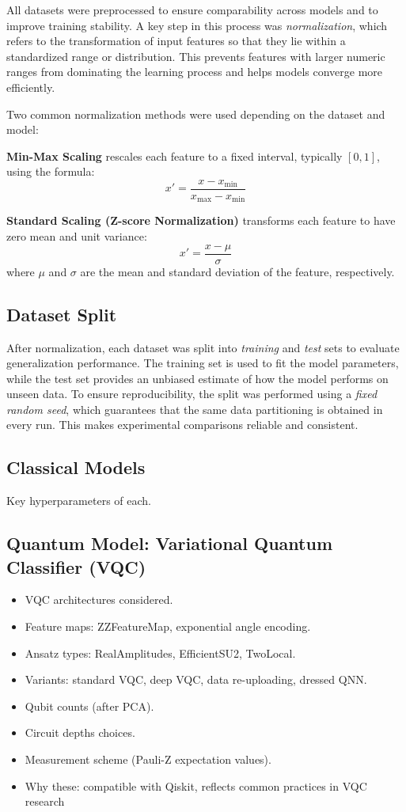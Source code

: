 All datasets were preprocessed to ensure comparability across models and to improve training stability. A key step in this process was \textit{normalization}, which refers to the transformation of input features so that they lie within a standardized range or distribution. This prevents features with larger numeric ranges from dominating the learning process and helps models converge more efficiently.

Two common normalization methods were used depending on the dataset and model:

\textbf{Min-Max Scaling} rescales each feature to a fixed interval, typically $[0,1]$, using the formula:
\[
x' = \frac{x - x_{\min}}{x_{\max} - x_{\min}}
\]


\textbf{Standard Scaling (Z-score Normalization)} transforms each feature to have zero mean and unit variance:
\[
x' = \frac{x - \mu}{\sigma}
\]
where $\mu$ and $\sigma$ are the mean and standard deviation of the feature, respectively. 

\subsection{Dataset Split}
After normalization, each dataset was split into \textit{training} and \textit{test} sets to evaluate generalization performance. The training set is used to fit the model parameters, while the test set provides an unbiased estimate of how the model performs on unseen data. To ensure reproducibility, the split was performed using a \textit{fixed random seed}, which guarantees that the same data partitioning is obtained in every run. This makes experimental comparisons reliable and consistent.


\subsection{Classical Models}
Key hyperparameters of each.

\subsection{Quantum Model: Variational Quantum Classifier (VQC)}


\begin{itemize}
    \item VQC architectures considered.
    \item Feature maps: ZZFeatureMap, exponential angle encoding.

    \item Ansatz types: RealAmplitudes, EfficientSU2, TwoLocal.
    \item Variants: standard VQC, deep VQC, data re-uploading, dressed QNN.
    \item Qubit counts (after PCA).
    \item Circuit depths choices.
    \item Measurement scheme (Pauli-Z expectation values).
    \item Why these: compatible with Qiskit, reflects common practices in VQC research
\end{itemize}



